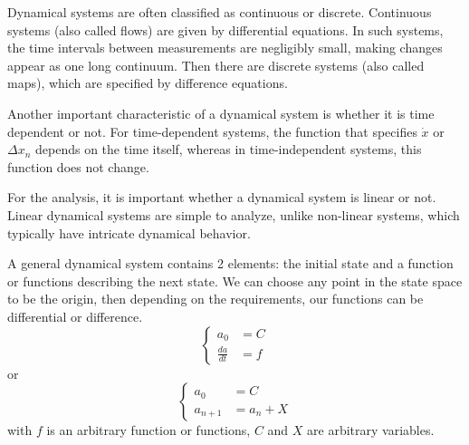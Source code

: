 \documentclass[a4paper]{article}
\begin{document}
Dynamical systems are often classified as continuous or discrete.
Continuous systems (also called flows) are given by differential equations.
In such systems, the time intervals between measurements are negligibly small, making changes appear as one long continuum.
Then there are discrete systems (also called maps), which are specified by difference equations.

Another important characteristic of a dynamical system is whether it is time dependent or not.
For time-dependent systems, the function that specifies \(\dot{x}\) or \(\Delta{x_n}\) depends on the time itself, whereas in time-independent systems, this function does not change.

For the analysis, it is important whether a dynamical system is linear or not.
Linear dynamical systems are simple to analyze, unlike non-linear systems, which typically have intricate dynamical behavior.

A general dynamical system contains 2 elements: the initial state and a function or functions describing the next state.
We can choose any point in the state space to be the origin, then depending on the requirements, our functions can be differential or difference.
\begin{equation*}
  \begin{cases}
    a_0           & = C \\
    \frac{da}{dt} & = f
  \end{cases}
\end{equation*}
or
\begin{equation*}
  \begin{cases}
    a_0       & = C       \\
    a_{n + 1} & = a_n + X
  \end{cases}
\end{equation*}
with \(f\) is an arbitrary function or functions, \(C\) and \(X\) are arbitrary variables.
\end{document}
